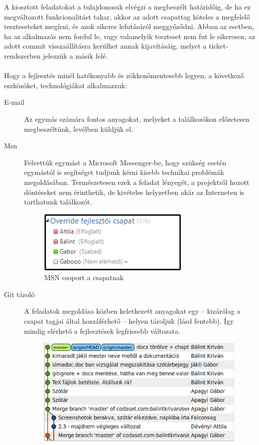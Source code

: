 A kiosztott feladatokat a tulajdonosuk elvégzi a megbeszélt határidőig, de ha ez megváltozott funkciona\-litást takar, akkor az adott csapattag köteles a megfelelő teszteseteket megírni, és azok sikeres lefutásáról meggyőződni. Abban az esetben, ha az alkalmazás nem fordul le, vagy valamelyik teszteset nem fut le sikeresen, az adott commit visszaállításra kerülhet annak kijavításáig, melyet a ticket-rendszerben jelezzük a másik felé.\\
\\
Hogy a fejlesztés minél hatékonyabb és zökkenőmentesebb legyen, a következő eszközöket, technológiákat alkalmazzuk:
\begin{description}
\item[E-mail] Az egymás számára fontos anyagokat, melyeket a találkozókon előzetesen megbeszéltünk, levélben küldjük el.
\item[Msn] Felvettük egymást a Microsoft Messenger-be, hogy szükség esetén egymástól is segítséget tudjunk kérni kisebb technikai problémák megoldásában. Természetesen ezek a feladat lényegét, a projektről hozott döntéseket nem érinthetik, de kivételes helyzetben akár az Interneten is tarthatunk találkozót.
\begin{figure}[h]
\begin{center}
\includegraphics{chapters/chapter02/msn.png}
\caption{MSN csoport a csapatnak}
\label{fig:msn}
\vspace{-20pt}
\end{center}
\end{figure}
\item[Git tároló] A feladatok megoldása közben keletkezett anyagokat egy -- kizárólag a csapat tagjai által hozzáférhető -- helyen tároljuk (lásd fentebb). Így mindig elérhető a fejlesztések legfrissebb változata.
\begin{figure}[h]
\begin{center}
\includegraphics[width=10cm]{chapters/chapter02/git.png}

\end{center}
\end{figure}
\end{description}
